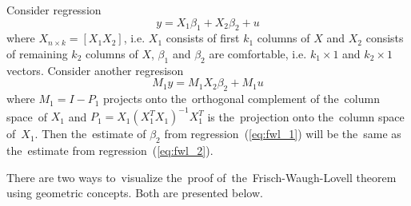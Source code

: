 
\begin{theorem}
Consider regression
\begin{equation} \label{eq:fwl_1}
y = X_1 \beta_1 + X_2 \beta_2 + u
\end{equation}
where $X_{n \times k} = [X_1 X_2]$, i.e. $X_1$ consists of first $k_1$ columns of $X$ and $X_2$ consists of remaining $k_2$ columns of $X$,
$\beta_1$ and $\beta_2$ are comfortable, i.e. $k_1 \times 1$ and $k_2 \times 1$ vectors.
Consider another regresison
\begin{equation}  \label{eq:fwl_2}
M_1 y = M_1 X_2 \beta_2 + M_1 u
\end{equation}
where $M_1 = I - P_1$ projects onto the~orthogonal complement of the~column space~of
$X_1$ and $P_1 = X_1(X_1^TX_1)^{-1}X_1^T$ is the~projection onto the~column space of~$X_1$.
Then the~estimate of $\beta_2$ from regression~(\ref{eq:fwl_1}) will be the~same
as the~estimate from regression~(\ref{eq:fwl_2}).
\end{theorem}

There are two ways to~visualize the~proof of~the~Frisch-Waugh-Lovell theorem
using geometric concepts. Both are presented below.

